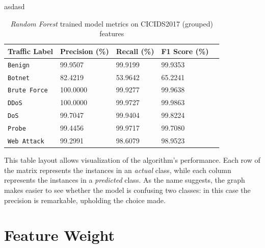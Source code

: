 asdasd
\begin{table}[h!]
   \centering
   \begin{tabular}{l|llll}
       \toprule 
       Traffic Label & Precision (\%) & Recall (\%) & F1 Score (\%) \\
       \midrule
       \rowcolor{black!10} \texttt{Benign} & 99.9507 & 99.9199 & 99.9353 \\
       \texttt{Botnet} & 82.4219 & 53.9642 & 65.2241 \\
       \rowcolor{black!10} \texttt{Brute Force} & 100.0000 & 99.9277 & 99.9638 \\
       \texttt{DDoS} & 100.0000 & 99.9727 & 99.9863 \\
       \rowcolor{black!10} \texttt{DoS} & 99.7047 & 99.9404 & 99.8224 \\
       \texttt{Probe} & 99.4456 & 99.9717 & 99.7080 \\
       \rowcolor{black!10} \texttt{Web Attack} & 99.2991 & 98.6079 & 98.9523 \\
       \bottomrule
   \end{tabular}
   \caption{\textit{Random Forest} trained model metrics on CICIDS2017 (grouped) features}
   \label{tab:grouped-metrics}
\end{table}

 \noindent This table layout allows visualization of the algorithm's performance. Each row of the matrix represents the instances in an \textit{actual} class, while each column represents the instances in a \textit{predicted} class. As the name suggests, the graph makes easier to see whether the model is confusing two classes: in this case the precision is remarkable, upholding the choice made.


 \section{Feature Weight}
\label{sec:feature-weight}

\textcolor{dimgray}{\lipsum[1-2]}